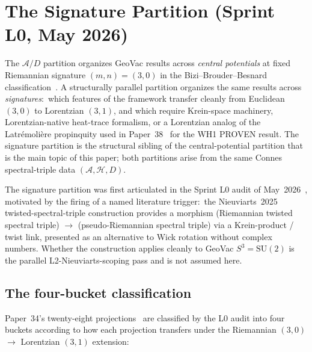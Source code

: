\documentclass[twocolumn,pra,amsmath,amssymb,superscriptaddress]{revtex4-2}
\begin{document}
\section{The Signature Partition (Sprint L0, May 2026)}
\label{sec:signature_partition}

The $\mathcal{A}/D$ partition organizes GeoVac results across
\emph{central potentials} at fixed Riemannian signature
$(m, n) = (3, 0)$ in the Bizi--Brouder--Besnard
classification~\cite{bizi_brouder_besnard2018}.  A structurally parallel
partition organizes the same results across \emph{signatures}:\
which features of the framework transfer cleanly from Euclidean $(3, 0)$
to Lorentzian $(3, 1)$, and which require Krein-space machinery,
Lorentzian-native heat-trace formalism, or a Lorentzian analog of the
Latr\'emoli\`ere propinquity used in Paper~38~\cite{paper38} for the
WH1 PROVEN result.  The signature partition is the structural sibling
of the central-potential partition that is the main topic of this
paper; both partitions arise from the same Connes spectral-triple data
$(\mathcal{A}, \mathcal{H}, D)$.

The signature partition was first articulated in the Sprint L0 audit
of May~2026~\cite{lorentzian_l0_memo}, motivated by the firing of a
named literature trigger:\ the Nieuviarts~2025~\cite{nieuviarts2025a}
twisted-spectral-triple construction provides a morphism
(Riemannian twisted spectral triple) $\to$ (pseudo-Riemannian spectral
triple) via a Krein-product / twist link, presented as an alternative
to Wick rotation without complex numbers.  Whether the construction
applies cleanly to GeoVac $S^3 = \mathrm{SU}(2)$ is the parallel
L2-Nieuviarts-scoping pass and is not assumed here.

\subsection{The four-bucket classification}
\label{sec:sig_buckets}

Paper~34's twenty-eight projections~\cite{paper34} are classified by
the L0 audit into four buckets according to how each projection
transfers under the Riemannian $(3, 0)$ $\to$ Lorentzian $(3, 1)$
extension:
\end{document}
